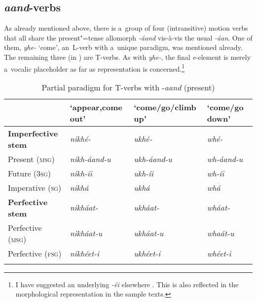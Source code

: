 \subsection{\textit{aand}-verbs}
\label{subsec:8-3-8}


As already mentioned above, there is a~group of four (intransitive) motion verbs that all share the present"=tense allomorph \textit{-áand} vis-à-vis the usual \textit{-áan}. One of them, \textit{yhe-} `come', an~L-verb with a~unique paradigm, was mentioned already. The remaining three (in ) are T-verbs. As with \textit{yhe-}, the final \textit{e}-element is merely a~vocalic placeholder as far as representation is concerned.\footnote{I have suggested an underlying \textit{-éi} elsewhere \citep{liljegrenhaider2011,liljegrenhaider2015}. This is also reflected in the morphological representation in the sample texts.}


\begin{table}[ht]
\caption{Partial paradigm for T-verbs with -\textit{aand} (present)}
\begin{tabularx}{\textwidth}{ l Q Q Q }
\lsptoprule
&
`appear,\newline come out' &
`come/go/\newline climb up' &
`come/go down'\\\hline
\textbf{Imperfective stem} &
\textit{nikhé- } &
\textit{ukhé-} &
\textit{whé-} \\
Present (\textsc{msg}) &
\textit{nikh-áand-u} &
\textit{ukh-áand-u} &
\textit{wh-áand-u} \\
Future (\textsc{3sg}) &
\textit{nikh-íi} &
\textit{ukh-íi} &
\textit{wh-íi} \\
Imperative (\textsc{sg}) &
\textit{nikhá} &
\textit{ukhá} &
\textit{whá} \\
\textbf{Perfective stem} &
\textit{nikháat-} &
\textit{ukháat-} &
\textit{wháat-} \\
Perfective (\textsc{msg}) &
\textit{nikháat-u} &
\textit{ukháat-u} &
\textit{whaát-u} \\
Perfective (\textsc{fsg}) &
\textit{nikhéet-i} &
\textit{ukhéet-i} &
\textit{whéet-i} \\\lspbottomrule
\end{tabularx}
\label{tab:8-10}
\end{table}


